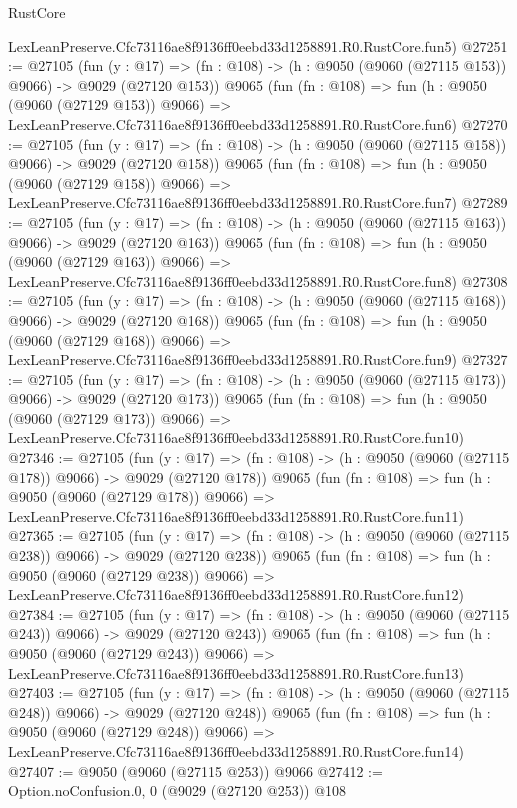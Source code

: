 \begin{lexlean}{RustCore}
\begin{coremodule}
    LexLeanPreserve.Cfc73116ae8f9136ff0eebd33d1258891.R0.RustCore.fun5)
@27251 := @27105
    (fun (y : @17) => (fn : @108) -> (h : @9050 (@9060 (@27115 @153)) @9066) -> @9029 (@27120 @153))
    @9065
    (fun (fn : @108) =>
    fun (h : @9050 (@9060 (@27129 @153)) @9066) =>
    LexLeanPreserve.Cfc73116ae8f9136ff0eebd33d1258891.R0.RustCore.fun6)
@27270 := @27105
    (fun (y : @17) => (fn : @108) -> (h : @9050 (@9060 (@27115 @158)) @9066) -> @9029 (@27120 @158))
    @9065
    (fun (fn : @108) =>
    fun (h : @9050 (@9060 (@27129 @158)) @9066) =>
    LexLeanPreserve.Cfc73116ae8f9136ff0eebd33d1258891.R0.RustCore.fun7)
@27289 := @27105
    (fun (y : @17) => (fn : @108) -> (h : @9050 (@9060 (@27115 @163)) @9066) -> @9029 (@27120 @163))
    @9065
    (fun (fn : @108) =>
    fun (h : @9050 (@9060 (@27129 @163)) @9066) =>
    LexLeanPreserve.Cfc73116ae8f9136ff0eebd33d1258891.R0.RustCore.fun8)
@27308 := @27105
    (fun (y : @17) => (fn : @108) -> (h : @9050 (@9060 (@27115 @168)) @9066) -> @9029 (@27120 @168))
    @9065
    (fun (fn : @108) =>
    fun (h : @9050 (@9060 (@27129 @168)) @9066) =>
    LexLeanPreserve.Cfc73116ae8f9136ff0eebd33d1258891.R0.RustCore.fun9)
@27327 := @27105
    (fun (y : @17) => (fn : @108) -> (h : @9050 (@9060 (@27115 @173)) @9066) -> @9029 (@27120 @173))
    @9065
    (fun (fn : @108) =>
    fun (h : @9050 (@9060 (@27129 @173)) @9066) =>
    LexLeanPreserve.Cfc73116ae8f9136ff0eebd33d1258891.R0.RustCore.fun10)
@27346 := @27105
    (fun (y : @17) => (fn : @108) -> (h : @9050 (@9060 (@27115 @178)) @9066) -> @9029 (@27120 @178))
    @9065
    (fun (fn : @108) =>
    fun (h : @9050 (@9060 (@27129 @178)) @9066) =>
    LexLeanPreserve.Cfc73116ae8f9136ff0eebd33d1258891.R0.RustCore.fun11)
@27365 := @27105
    (fun (y : @17) => (fn : @108) -> (h : @9050 (@9060 (@27115 @238)) @9066) -> @9029 (@27120 @238))
    @9065
    (fun (fn : @108) =>
    fun (h : @9050 (@9060 (@27129 @238)) @9066) =>
    LexLeanPreserve.Cfc73116ae8f9136ff0eebd33d1258891.R0.RustCore.fun12)
@27384 := @27105
    (fun (y : @17) => (fn : @108) -> (h : @9050 (@9060 (@27115 @243)) @9066) -> @9029 (@27120 @243))
    @9065
    (fun (fn : @108) =>
    fun (h : @9050 (@9060 (@27129 @243)) @9066) =>
    LexLeanPreserve.Cfc73116ae8f9136ff0eebd33d1258891.R0.RustCore.fun13)
@27403 := @27105
    (fun (y : @17) => (fn : @108) -> (h : @9050 (@9060 (@27115 @248)) @9066) -> @9029 (@27120 @248))
    @9065
    (fun (fn : @108) =>
    fun (h : @9050 (@9060 (@27129 @248)) @9066) =>
    LexLeanPreserve.Cfc73116ae8f9136ff0eebd33d1258891.R0.RustCore.fun14)
@27407 := @9050 (@9060 (@27115 @253)) @9066
@27412 := Option.noConfusion.{0, 0} (@9029 (@27120 @253)) @108

\end{coremodule}
\end{lexlean}
